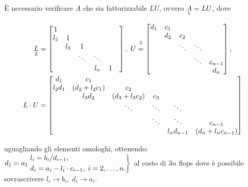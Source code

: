\noindent È necessario verificare $A$ che sia fattorizzabile $LU$, ovvero $\underset{\footnotemark}{A}=LU$, dove
\begin{equation*}
    \begin{matrix}
        \underset{\footnotemark}{L}=
    \begin{bmatrix}
        1 & & & &\\
        l_2 & 1 & & &\\
        & l_3 & 1 & &\\
        & & \ddots & \ddots & &\\
        & & & l_n & 1
    \end{bmatrix}
    ,\; U\overset{\footnotemark}{=}
    \begin{bmatrix}
        d_1 & c_1 &\\
            & d_2 & c_2\\
            & & \ddots & \ddots\\
            & & & \ddots & c_{n-1}\\
            & & & & d_n
    \end{bmatrix},\\
    L\cdot U=
    \begin{bmatrix}
        d_1 & c_1 & & & &\\
        l_2d_1 & (d_2+l_2 c_1) & c_2 & & &\\
            & l_3d_2 & (d_3+l_3c_2) & c_3 & &\\
            & & \ddots &\ddots & \ddots &\\
            & & & \ddots & \ddots & c_{n-1}\\
            & & & &  l_nd_{n-1} & (d_n+l_nc_{n-1})
    \end{bmatrix}
    \end{matrix}
\end{equation*}
\addtocounter{footnote}{-1}


\noindent uguagliando gli elementi omologhi, ottenendo:\\
$d_1=a_1\\
\begin{rcases}
l_i=b_i/d_{i-1},\\
d_i=a_i-l_i\cdot c_{i-1},\; i=2,\hdots, n.
\end{rcases}$
al costo di $3n$ flops dove è possibile sovrascrivere $l_i\rightarrow b_i,\; d_i\rightarrow a_i$.


